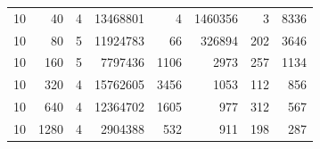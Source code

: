 \begin{table}[p]
\begin{minipage}[c]{0.49\textwidth}
\begin{tabular}{|rr|rr|rr|rr|}
\num{10} &   \num{40} & \num{4} & \num{13468801} &    \num{4} & \num{1460356} &   \num{3} & \num{8336} \\
\num{10} &   \num{80} & \num{5} & \num{11924783} &   \num{66} &  \num{326894} & \num{202} & \num{3646} \\
\num{10} &  \num{160} & \num{5} &  \num{7797436} & \num{1106} &    \num{2973} & \num{257} & \num{1134} \\
\num{10} &  \num{320} & \num{4} & \num{15762605} & \num{3456} &    \num{1053} & \num{112} &  \num{856} \\
\num{10} &  \num{640} & \num{4} & \num{12364702} & \num{1605} &     \num{977} & \num{312} &  \num{567} \\
\num{10} & \num{1280} & \num{4} &  \num{2904388} &  \num{532} &     \num{911} & \num{198} &  \num{287} \\
\hline

\end{tabular}
\end{minipage}
\end{table}
